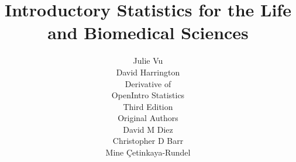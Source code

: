 

\title{\huge Introductory Statistics for the Life and Biomedical Sciences}


\author{\large Julie Vu \\
\large David Harrington \\ [5mm]
\Large Derivative of \\
\Large OpenIntro Statistics \\
\Large Third Edition \\[1.5mm]
\large Original Authors \\ [1.5mm]
\large David M Diez \\ 
\large Christopher D Barr \\
\large Mine \c{C}etinkaya-Rundel
}

